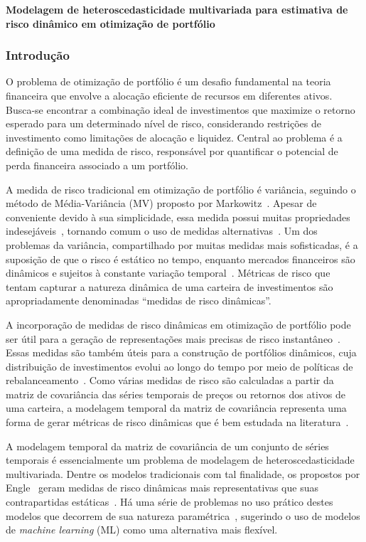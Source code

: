 \documentclass[a4paper, 12pt]{article}
\begin{document}
\begin{center}
\textbf{Modelagem de heteroscedasticidade multivariada para estimativa de risco
dinâmico em otimização de portfólio}
\end{center}
\subsubsection*{Introdução}
\begin{spacing}{.9}

O problema de otimização de portfólio é um desafio fundamental na teoria
financeira que envolve a alocação eficiente de recursos em diferentes
ativos. Busca-se encontrar a combinação ideal de investimentos que maximize
o retorno esperado para um determinado nível de risco, considerando
restrições de investimento como limitações de alocação e liquidez. Central
ao problema é a definição de uma medida de risco, responsável por
quantificar o potencial de perda financeira associado a um portfólio.%

A medida de risco tradicional em otimização de portfólio é variância, seguindo
o método de Média-Variância (MV) proposto por Markowitz~\cite{markowitz}.
Apesar de conveniente devido à sua simplicidade, essa medida possui
muitas propriedades indesejáveis~\cite{rachev}, tornando comum o uso de
medidas alternativas~\cite{gambrah2014risk}. Um dos problemas da
variância, compartilhado por muitas medidas mais sofisticadas, é a
suposição de que o risco é estático no tempo, enquanto mercados financeiros são
dinâmicos e sujeitos à constante variação temporal~\cite{procacci}.
Métricas de risco que tentam capturar a natureza dinâmica de uma carteira
de investimentos são apropriadamente denominadas ``medidas de risco
dinâmicas''.

A incorporação de medidas de risco dinâmicas em otimização de portfólio pode
ser útil para a geração de representações mais precisas de risco
instantâneo~\cite{chan1999portfolio}. Essas medidas são também úteis para a
construção de portfólios dinâmicos, cuja distribuição de investimentos
evolui ao longo do tempo por meio de políticas de
rebalanceamento~\cite{metin, holten}. Como várias medidas de risco são
calculadas a partir da matriz de covariância das séries temporais de preços
ou retornos dos ativos de uma carteira, a modelagem temporal da matriz de
covariância representa uma forma de gerar métricas de risco dinâmicas que é bem
estudada na literatura~\cite{chan1999portfolio}.

A modelagem temporal da matriz de covariância de um conjunto de séries
temporais é essencialmente um problema de modelagem de heteroscedasticidade
multivariada. Dentre os modelos tradicionais com tal finalidade, os propostos
por Engle~\cite{bauwens} geram medidas de risco dinâmicas mais representativas
que suas contrapartidas estáticas~\cite{metin, holten, weirum}. Há uma série de
problemas no uso prático destes modelos que decorrem de sua natureza
paramétrica~\cite{morettin}, sugerindo o uso de modelos de \emph{machine
learning} (ML) como uma alternativa mais flexível.


\end{spacing}
\end{document}

